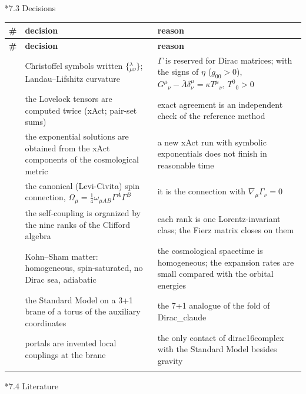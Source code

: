 \documentclass[10pt,a4paper]{article}
\makeatletter
\renewcommand\subsection{\@startsection{subsection}{2}{\z@}{-3.25ex\@plus -1ex \@minus -.2ex}{1.5ex \@plus .2ex}{\normalfont\large\bfseries\raggedright}}
\makeatother
\begin{document}
\subsection*{7.3 Decisions}
{\footnotesize
\begin{longtable}{>{\raggedright\arraybackslash}p{}>{\raggedright\arraybackslash}p{}>{\raggedright\arraybackslash}p{}}
\toprule
\textbf{\#} & \textbf{decision} & \textbf{reason} \\
\midrule\endfirsthead
\toprule
\textbf{\#} & \textbf{decision} & \textbf{reason} \\
\midrule\endhead
\endfoot
\bottomrule\endlastfoot
1 & Christoffel symbols written $\{{}^{\lambda}_{\mu\nu}\}$; Landau–Lifshitz curvature & $\Gamma$ is reserved for Dirac matrices; with the signs of $\eta$ ($g_{00}>0$), $G^\mu{}_\nu-\bar\Lambda\delta^\mu_\nu=\kappa T^\mu{}_\nu$, $T^0{}_0>0$ \\
2 & the Lovelock tensors are computed twice (xAct; pair-set sums) & exact agreement is an independent check of the reference method \\
3 & the exponential solutions are obtained from the xAct components of the cosmological metric & a new xAct run with symbolic exponentials does not finish in reasonable time \\
4 & the canonical (Levi-Civita) spin connection, $\Omega_\mu=\frac14\omega_{\mu AB}\Gamma^A\Gamma^B$ & it is the connection with $\nabla_\mu\Gamma_\nu=0$ \\
5 & the self-coupling is organized by the nine ranks of the Clifford algebra & each rank is one Lorentz-invariant class; the Fierz matrix closes on them \\
6 & Kohn–Sham matter: homogeneous, spin-saturated, no Dirac sea, adiabatic & the cosmological spacetime is homogeneous; the expansion rates are small compared with the orbital energies \\
7 & the Standard Model on a 3+1 brane of a torus of the auxiliary coordinates & the 7+1 analogue of the fold of Dirac\_claude \\
8 & portals are invented local couplings at the brane & the only contact of dirac16complex with the Standard Model besides gravity \\*
\end{longtable}}
\subsection*{7.4 Literature}
\end{document}
